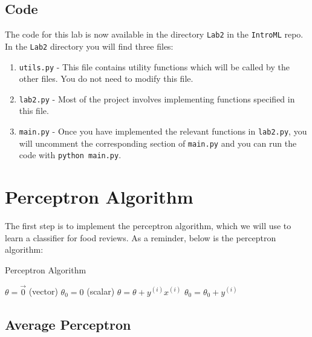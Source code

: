 \documentclass{article}
\begin{document}
\subsection{Code}

The code for this lab is now available in the directory \texttt{Lab2} in the \texttt{IntroML} repo. In the \texttt{Lab2} directory you will find three files:

\begin{enumerate}
    \item \texttt{utils.py} - This file contains utility functions which will be called by the other files. You do not need to modify this file.
    \item \texttt{lab2.py} - Most of the project involves implementing functions specified in this file.
    \item \texttt{main.py} - Once you have implemented the relevant functions in \texttt{lab2.py}, you will uncomment the corresponding section of \texttt{main.py} and you can run the code with \texttt{python main.py}.
\end{enumerate}

\section{Perceptron Algorithm}

The first step is to implement the perceptron algorithm, which we will use to learn a classifier for food reviews. As a reminder, below is the perceptron algorithm:

\begin{algorithm}[H]
    \caption{Perceptron Algorithm}
    \label{perceptron}
    
    \begin{algorithmic}[1]
        \State $\theta = \vec{0}$ (vector)
        \State $\theta_0 = 0$ (scalar)
                    \State $\theta = \theta + y^{(i)} x^{(i)}$
                    \State $\theta_0 = \theta_0 + y^{(i)}$
                \EndIf
            \EndFor
        \EndFor
        \State {}
        \EndProcedure
    \end{algorithmic}
\end{algorithm}

\subsection{Average Perceptron}
\end{document}
